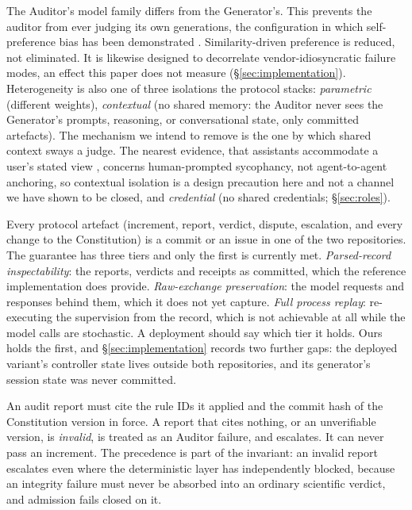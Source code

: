 \documentclass[11pt,letterpaper]{article}
\newcommand{\invariant}[1]{\textbf{I#1}}
\begin{document}
\begin{description}[itemsep=2pt,topsep=3pt]
  \item[\invariant{1} --- Heterogeneity.] The Auditor's model family differs from the Generator's. This prevents the auditor from ever judging its own generations, the configuration in which self-preference bias has been demonstrated \cite{panickssery2024}. Similarity-driven preference is reduced, not eliminated. It is likewise designed to decorrelate vendor-idiosyncratic failure modes, an effect this paper does not measure (\S\ref{sec:implementation}). Heterogeneity is also one of three isolations the protocol stacks: \emph{parametric} (different weights), \emph{contextual} (no shared memory: the Auditor never sees the Generator's prompts, reasoning, or conversational state, only committed artefacts). The mechanism we intend to remove is the one by which shared context sways a judge. The nearest evidence, that assistants accommodate a user's stated view \cite{sharma2023sycophancy}, concerns human-prompted sycophancy, not agent-to-agent anchoring, so contextual isolation is a design precaution here and not a channel we have shown to be closed, and \emph{credential} (no shared credentials; \S\ref{sec:roles}).
  \item[\invariant{2} --- Ledger completeness.] Every protocol artefact (increment, report, verdict, dispute, escalation, and every change to the Constitution) is a commit or an issue in one of the two repositories. The guarantee has three tiers and only the first is currently met. \emph{Parsed-record inspectability}: the reports, verdicts and receipts as committed, which the reference implementation does provide. \emph{Raw-exchange preservation}: the model requests and responses behind them, which it does not yet capture. \emph{Full process replay}: re-executing the supervision from the record, which is not achievable at all while the model calls are stochastic. A deployment should say which tier it holds. Ours holds the first, and \S\ref{sec:implementation} records two further gaps: the deployed variant's controller state lives outside both repositories, and its generator's session state was never committed.
  \item[\invariant{3} --- Citation validity.] An audit report must cite the rule IDs it applied and the commit hash of the Constitution version in force. A report that cites nothing, or an unverifiable version, is \emph{invalid}, is treated as an Auditor failure, and escalates. It can never pass an increment. The precedence is part of the invariant: an invalid report escalates even where the deterministic layer has independently blocked, because an integrity failure must never be absorbed into an ordinary scientific verdict, and admission fails closed on it.

\end{description}
\end{document}
